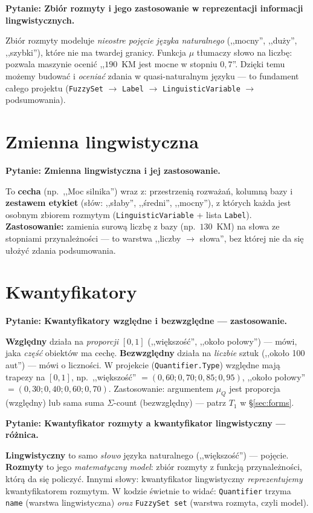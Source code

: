 \documentclass[11pt]{article}
\newcommand{\code}[1]{\texttt{#1}}
\newcommand{\pytan}[1]{\medskip\noindent\textbf{\textcolor{anbg}{Pytanie:} #1}\par\smallskip}
\begin{document}
\pytan{Zbiór rozmyty i jego zastosowanie w reprezentacji informacji lingwistycznych.}
Zbiór rozmyty modeluje \emph{nieostre pojęcie języka naturalnego} (,,mocny'', ,,duży'',
,,szybki''), które nie ma twardej granicy. Funkcja $\mu$ tłumaczy słowo na liczbę: pozwala
maszynie ocenić ,,$190$~KM jest mocne w stopniu $0{,}7$''. Dzięki temu możemy budować i
\emph{oceniać} zdania w quasi-naturalnym języku --- to fundament całego projektu
(\code{FuzzySet} $\to$ \code{Label} $\to$ \code{LinguisticVariable} $\to$ podsumowania).

\section{Zmienna lingwistyczna}

\pytan{Zmienna lingwistyczna i jej zastosowanie.}
To \textbf{cecha} (np.\ ,,Moc silnika'') wraz z: przestrzenią rozważań, kolumną bazy i
\textbf{zestawem etykiet} (słów: ,,słaby'', ,,średni'', ,,mocny''), z których każda jest
osobnym zbiorem rozmytym (\code{LinguisticVariable} + lista \code{Label}). \textbf{Zastosowanie:}
zamienia surową liczbę z bazy (np.\ $130$~KM) na słowa ze stopniami przynależności --- to
warstwa ,,liczby $\to$ słowa'', bez której nie da się ułożyć zdania podsumowania.

\section{Kwantyfikatory}

\pytan{Kwantyfikatory względne i bezwzględne --- zastosowanie.}
\textbf{Względny} działa na \emph{proporcji} $[0,1]$ (,,większość'', ,,około połowy'') ---
mówi, jaka \emph{część} obiektów ma cechę. \textbf{Bezwzględny} działa na \emph{liczbie}
sztuk (,,około 100 aut'') --- mówi o liczności. W projekcie (\code{Quantifier.Type})
względne mają trapezy na $[0,1]$, np.\ ,,większość'' $=(0{,}60;0{,}70;0{,}85;0{,}95)$,
,,około połowy'' $=(0{,}30;0{,}40;0{,}60;0{,}70)$. Zastosowanie: argumentem $\mu_Q$ jest
proporcja (względny) lub sama suma $\Sigma$-count (bezwzględny) --- patrz $T_1$ w §\ref{sec:forms}.

\pytan{Kwantyfikator rozmyty a kwantyfikator lingwistyczny --- różnica.}
\textbf{Lingwistyczny} to samo \emph{słowo} języka naturalnego (,,większość'') ---
pojęcie. \textbf{Rozmyty} to jego \emph{matematyczny model}: zbiór rozmyty z funkcją
przynależności, którą da się policzyć. Innymi słowy: kwantyfikator lingwistyczny
\emph{reprezentujemy} kwantyfikatorem rozmytym. W kodzie świetnie to widać: \code{Quantifier}
trzyma \code{name} (warstwa lingwistyczna) \emph{oraz} \code{FuzzySet set} (warstwa rozmyta,
czyli model).
\end{document}
